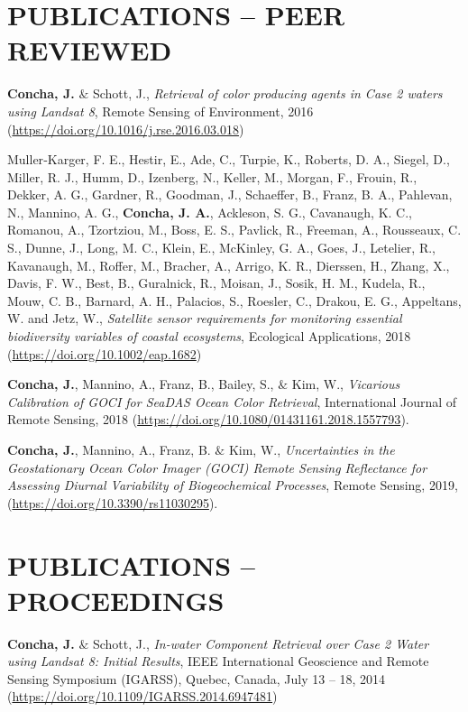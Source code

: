 \documentclass[11pt]{res} %
\begin{document}
\begin{resume}
\section{PUBLICATIONS -- PEER REVIEWED}
\vspace{0.1in}
{\bf Concha, J.} $\&$ Schott, J., {\it Retrieval of color producing agents in Case 2 waters using Landsat 8}, Remote Sensing of Environment, 2016 (\url{https://doi.org/10.1016/j.rse.2016.03.018})

Muller‐Karger, F. E., Hestir, E., Ade, C., Turpie, K., Roberts, D. A., Siegel, D., Miller, R. J., Humm, D., Izenberg, N., Keller, M., Morgan, F., Frouin, R., Dekker, A. G., Gardner, R., Goodman, J., Schaeffer, B., Franz, B. A., Pahlevan, N., Mannino, A. G., {\bf Concha, J. A.}, Ackleson, S. G., Cavanaugh, K. C., Romanou, A., Tzortziou, M., Boss, E. S., Pavlick, R., Freeman, A., Rousseaux, C. S., Dunne, J., Long, M. C., Klein, E., McKinley, G. A., Goes, J., Letelier, R., Kavanaugh, M., Roffer, M., Bracher, A., Arrigo, K. R., Dierssen, H., Zhang, X., Davis, F. W., Best, B., Guralnick, R., Moisan, J., Sosik, H. M., Kudela, R., Mouw, C. B., Barnard, A. H., Palacios, S., Roesler, C., Drakou, E. G., Appeltans, W. and Jetz, W., {\it Satellite sensor requirements for monitoring essential biodiversity variables of coastal ecosystems}, Ecological Applications, 2018 (\url{https://doi.org/10.1002/eap.1682})

{\bf Concha, J.}, Mannino, A., Franz, B., Bailey, S., $\&$ Kim, W., {\it Vicarious Calibration of GOCI for SeaDAS Ocean Color Retrieval}, International Journal of Remote Sensing, 2018 (\url{https://doi.org/10.1080/01431161.2018.1557793}).

\vspace{0.1in}
{\bf Concha, J.}, Mannino, A., Franz, B. $\&$ Kim, W., {\it Uncertainties in the Geostationary Ocean Color Imager (GOCI) Remote Sensing Reflectance for Assessing Diurnal Variability of Biogeochemical Processes}, Remote Sensing, 2019, (\url{https://doi.org/10.3390/rs11030295}).
\section{PUBLICATIONS -- PROCEEDINGS}
\vspace{0.1in}
{\bf Concha, J.} $\&$ Schott, J., {\it In-water Component Retrieval over Case 2 Water using Landsat 8: Initial Results}, IEEE International Geoscience and Remote Sensing Symposium (IGARSS), Quebec, Canada, July 13 -- 18, 2014 (\url{https://doi.org/10.1109/IGARSS.2014.6947481})


\end{resume}
\end{document}
